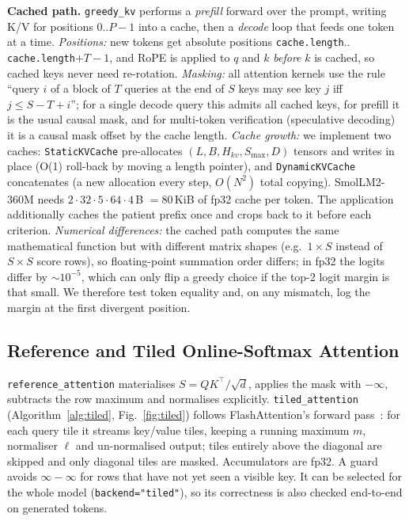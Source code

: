 \documentclass[conference]{IEEEtran}
\begin{document}
\textbf{Cached path.} \texttt{greedy\_kv} performs a \emph{prefill} forward over the prompt, writing K/V for positions $0..P{-}1$ into a cache, then a \emph{decode} loop that feeds one token at a time. \emph{Positions:} new tokens get absolute positions \texttt{cache.length}$..$\texttt{cache.length}$+T{-}1$, and RoPE is applied to $q$ and $k$ \emph{before} $k$ is cached, so cached keys never need re-rotation. \emph{Masking:} all attention kernels use the rule ``query $i$ of a block of $T$ queries at the end of $S$ keys may see key $j$ iff $j\le S{-}T{+}i$''; for a single decode query this admits all cached keys, for prefill it is the usual causal mask, and for multi-token verification (speculative decoding) it is a causal mask offset by the cache length. \emph{Cache growth:} we implement two caches: \texttt{StaticKVCache} pre-allocates $(L,B,H_{kv},S_{\max},D)$ tensors and writes in place (O(1) roll-back by moving a length pointer), and \texttt{DynamicKVCache} concatenates (a new allocation every step, $O(N^2)$ total copying). SmolLM2-360M needs $2\cdot32\cdot5\cdot64\cdot4$\,B $=80$\,KiB of fp32 cache per token. The application additionally caches the patient prefix once and crops back to it before each criterion. \emph{Numerical differences:} the cached path computes the same mathematical function but with different matrix shapes (e.g.\ $1\times S$ instead of $S\times S$ score rows), so floating-point summation order differs; in fp32 the logits differ by $\sim10^{-5}$, which can only flip a greedy choice if the top-2 logit margin is that small. We therefore test token equality and, on any mismatch, log the margin at the first divergent position.

\subsection{Reference and Tiled Online-Softmax Attention}
\texttt{reference\_attention} materialises $S{=}QK^\top/\sqrt{d}$, applies the mask with $-\infty$, subtracts the row maximum and normalises explicitly. \texttt{tiled\_attention} (Algorithm~\ref{alg:tiled}, Fig.~\ref{fig:tiled}) follows FlashAttention's forward pass~\cite{dao2022flashattention,milakov2018online}: for each query tile it streams key/value tiles, keeping a running maximum $m$, normaliser $\ell$ and un-normalised output; tiles entirely above the diagonal are skipped and only diagonal tiles are masked. Accumulators are fp32. A guard avoids $\infty-\infty$ for rows that have not yet seen a visible key. It can be selected for the whole model (\texttt{backend="tiled"}), so its correctness is also checked end-to-end on generated tokens.
\end{document}
